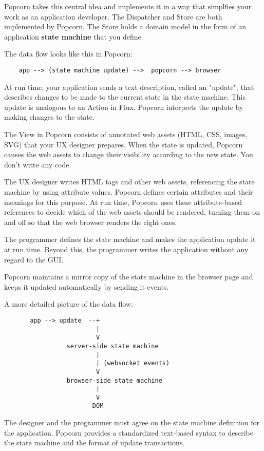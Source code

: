 \documentclass[12pt]{article}
\begin{document}
Popcorn takes this central idea and implements it in a way that
simplfies your work as an application developer. The Dispatcher and
Store are both implemented by Popcorn. The Store holds a domain model
in the form of an application {\bf state machine} that you define.

The data flow looks like this in Popcorn:

\begin{verbatim}
    app --> (state machine update) -->  popcorn --> browser
\end{verbatim}

At run time, your application sends a text description, called an
"update", that describes changes to be made to the current state in
the state machine. This update is analogous to an Action in Flux.
Popcorn interprets the update by making changes to the state.

The View in Popcorn consists of annotated web assets (HTML, CSS,
images, SVG) that your UX designer prepares. When the state is
updated, Popcorn causes the web assets to change their visibility
according to the new state. You don't write any code.

The UX designer writes HTML tags and other web assets, referencing the
state machine by using attribute values. Popcorn defines certain
attributes and their meanings for this purpose. At run time, Popcorn
uses these attribute-based references to decide which of the web
assets should be rendered, turning them on and off so that the web
browser renders the right ones.

The programmer defines the state machine and makes the application
update it at run time. Beyond this, the programmer writes the
application without any regard to the GUI.

Popcorn maintains a mirror copy of the state machine in the browser
page and keeps it updated automatically by sending it events.

A more detailed picture of the data flow:

\begin{verbatim}
       app --> update  --+
                         |
                         V
                 server-side state machine
                         |
                         | (websocket events)
                         V
                 browser-side state machine
                         |
                         V
                        DOM
\end{verbatim}

The designer and the programmer must agree on the state machine
definition for the application. Popcorn provides a standardized
text-based syntax to describe the state machine and the format of
update transactions.
\end{document}
